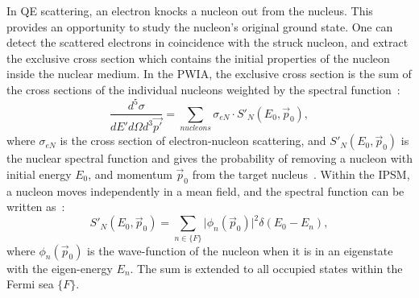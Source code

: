  In QE scattering, an electron knocks a nucleon out from the nucleus. This provides an opportunity to study the nucleon's original ground state. One can detect the scattered electrons in coincidence with the struck nucleon, and extract the exclusive cross section which contains the initial properties of the nucleon inside the nuclear medium. In the PWIA, the exclusive cross section is the sum of the cross sections of the individual nucleons weighted by the spectral function~\cite{DeForest1983,john_thesis}:
\begin{equation}
  \frac{d^{5}\sigma}{dE'd\Omega d^{3}\vec{p'}} = \sum_{nucleons}\sigma_{eN}\cdot S'_{N}(E_{0},\vec{p}_{0}),
  \label{quasi_xs_spectral_function}
\end{equation}
where $\sigma_{eN}$ is the cross section of electron-nucleon scattering, and $S'_{N}(E_{0},\vec{p}_{0})$ is the nuclear spectral function and gives the probability of removing a nucleon with initial energy $E_{0}$, and momentum $\vec{p}_{0}$ from the target nucleus~\cite{qe_donal}. Within the IPSM, a nucleon moves independently in a mean field, and the spectral function can be written as~\cite{qe_donal}:
\begin{equation}
 S'_{N}(E_{0},\vec{p}_{0}) = \sum_{n\in \lbrace F\rbrace}\vert\phi_{n}(\vec{p}_{0})\vert^{2}\delta(E_{0}-E_{n}),
\end{equation}
where $\phi_{n}(\vec{p}_{0})$ is the wave-function of the nucleon when it is in an eigenstate with the eigen-energy $E_{n}$. The sum is extended to all occupied states within the Fermi sea $\lbrace F\rbrace$. 

